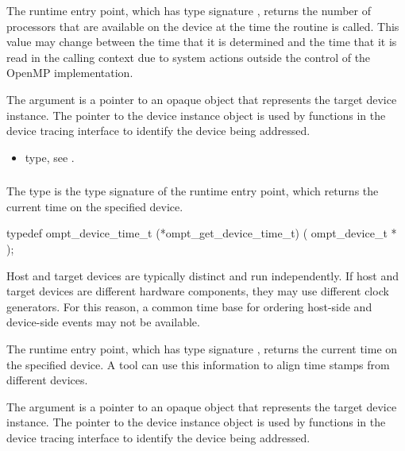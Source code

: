\descr
The  runtime entry point, which has type 
signature , returns the number of processors 
that are available on the device at the time the routine is called. This value 
may change between the time that it is determined and the time that it is read 
in the calling context due to system actions outside the control of the OpenMP 
implementation.

\argdesc
The  argument is a pointer to an opaque object that
represents the target device instance. The pointer to the device
instance object is used by functions in the device tracing interface
to identify the device being addressed.

\crossreferences
\begin{itemize}
\item {} type, see .
\end{itemize}



\subsubsection{}
\label{sec:ompt_get_device_time_t}

\summary
The  type is the type signature of the 
 runtime entry point, which returns the 
current time on the specified device.

\format
\begin{ccppspecific}
\begin{omptInquiry}
typedef ompt_device_time_t (*ompt_get_device_time_t) (
  ompt_device_t *
);
\end{omptInquiry}
\end{ccppspecific}

\descr
Host and target devices are typically distinct and run independently.
If host and target devices are different hardware components, they
may use different clock generators. For this reason, a common time 
base for ordering host-side and device-side events may not be available.

The  runtime entry point, which has type 
signature , returns the current time on 
the specified device. A tool can use this information to align time 
stamps from different devices.

\argdesc
The  argument is a pointer to an opaque object that
represents the target device instance. The pointer to the device
instance object is used by functions in the device tracing interface
to identify the device being addressed.

